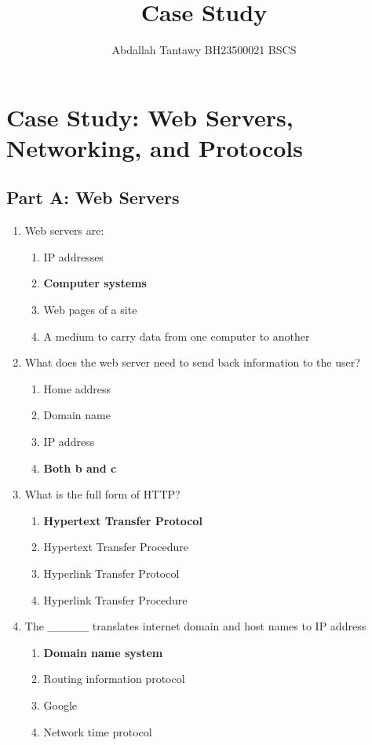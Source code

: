 \documentclass{article}
\title{Case Study}
\author{Abdallah Tantawy \quad BH23500021 \quad BSCS}
\begin{document}
\maketitle


\section*{Case Study: Web Servers, Networking, and Protocols}

\subsection*{Part A: Web Servers}

\begin{enumerate}[label=\arabic*.]
    \item Web servers are:
    \begin{enumerate}
        \item IP addresses
        \item \textbf{Computer systems}
        \item Web pages of a site
        \item A medium to carry data from one computer to another
    \end{enumerate}

    \item What does the web server need to send back information to the user?
    \begin{enumerate}
        \item Home address
        \item Domain name
        \item IP address
        \item \textbf{Both b and c}
    \end{enumerate}

    \item What is the full form of HTTP?
    \begin{enumerate}
        \item \textbf{Hypertext Transfer Protocol}
        \item Hypertext Transfer Procedure
        \item Hyperlink Transfer Protocol
        \item Hyperlink Transfer Procedure
    \end{enumerate}

    \item The \_\_\_\_\_ translates internet domain and host names to IP address
    \begin{enumerate}
        \item \textbf{Domain name system}
        \item Routing information protocol
        \item Google
        \item Network time protocol
    \end{enumerate}


\end{enumerate}
\end{document}
